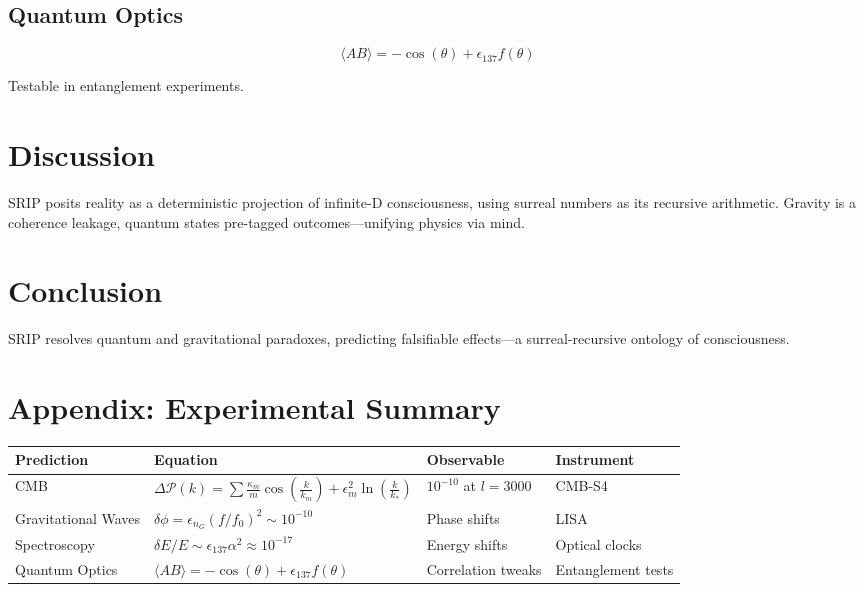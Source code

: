 \documentclass[12pt]{article}
\begin{document}
\subsection{Quantum Optics}
\[
\langle A B \rangle = -\cos(\theta) + \epsilon_{137} f(\theta)
\]

Testable in entanglement experiments.

\section{Discussion}
SRIP posits reality as a deterministic projection of infinite-D consciousness, using surreal numbers as its recursive arithmetic. Gravity is a coherence leakage, quantum states pre-tagged outcomes—unifying physics via mind.

\section{Conclusion}
SRIP resolves quantum and gravitational paradoxes, predicting falsifiable effects—a surreal-recursive ontology of consciousness.

\section*{Appendix: Experimental Summary}
\begin{tabularx}{\textwidth}{|l|X|l|l|}
\hline
\textbf{Prediction} & \textbf{Equation} & \textbf{Observable} & \textbf{Instrument} \\
\hline
CMB & \(\Delta \mathcal{P}(k) = \sum \frac{\kappa_m}{m} \cos\left(\frac{k}{k_m}\right) + \epsilon_m^2 \ln\left(\frac{k}{k_*}\right)\) & \(10^{-10}\) at \(l = 3000\) & CMB-S4 \\
\hline
Gravitational Waves & \(\delta \phi = \epsilon_{n_G} (f/f_0)^2 \sim 10^{-10}\) & Phase shifts & LISA \\
\hline
Spectroscopy & \(\delta E / E \sim \epsilon_{137} \alpha^2 \approx 10^{-17}\) & Energy shifts & Optical clocks \\
\hline
Quantum Optics & \(\langle A B \rangle = -\cos(\theta) + \epsilon_{137} f(\theta)\) & Correlation tweaks & Entanglement tests \\
\hline
\end{tabularx}
\end{document}
